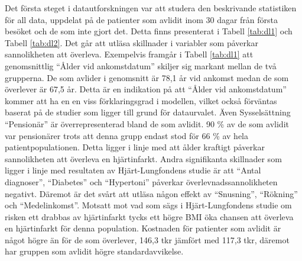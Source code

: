 Det första steget i datautforskningen var att studera den beskrivande statistiken för all data, uppdelat på de patienter som avlidit inom 30 dagar från första besöket och de som inte gjort det. Detta finns presenterat i Tabell \ref{tab:dl1} och Tabell \ref{tab:dl2}. Det går att utläsa skillnader i variabler som påverkar sannolikheten att överleva. Exempelvis framgår i Tabell \ref{tab:dl1} att genomsnittlig “Ålder vid ankomstdatum” skiljer sig markant mellan de två grupperna. De som avlider i genomsnitt är 78,1 år vid ankomst medan de som överlever är 67,5 år. Detta är en indikation på att “Ålder vid ankomstdatum” kommer att ha en en viss förklaringsgrad i modellen, vilket också förväntas baserat på de studier som ligger till grund för dataurvalet. Även Sysselsättning “Pensionär” är överrepresenterad bland de som avlidit. 90 \% av de som avlidit var pensionärer trots att denna grupp endast stod för 66 \% av hela patientpopulationen. Detta ligger i linje med att ålder kraftigt påverkar sannolikheten att överleva en hjärtinfarkt. Andra signifikanta skillnader som ligger i linje med resultaten av Hjärt-Lungfondens studie är att “Antal diagnoser”, “Diabetes” och “Hypertoni” påverkar överlevnadssannolikheten negativt. Däremot är det svårt att utläsa någon effekt av “Snusning”, “Rökning” och “Medelinkomst”. Motsatt mot vad som sägs i Hjärt-Lungfondens studie om risken ett drabbas av hjärtinfarkt tycks ett högre BMI öka chansen att överleva en hjärtinfarkt för denna population. Kostnaden för patienter som avlidit är något högre än för de som överlever, 146,3 tkr jämfört med 117,3 tkr, däremot har gruppen som avlidit högre standardavvikelse.

